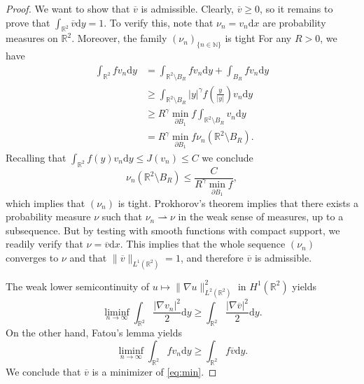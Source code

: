 \documentclass[10pt,a4paper]{article}
\newcommand{\NN}{\mathbb{N}}
\newcommand{\RR}{\mathbb{R}}
\numberwithin{equation}{section}
\begin{document}
\begin{proof}
	We want to show that $ \overline{v} $ is admissible. Clearly, $ \overline{v} \geq 0 $, so it remains to prove that $ \int_{\RR^{2}} \overline{v} \mathrm{d}y = 1  $. To verify this, note that $ \nu_n =  v_n \mathrm{d}x $ are probability measures on $ \RR^{2} $. Moreover, the family $ (\nu_n)_{\{n\in \NN\}} $ is tight For any $ R > 0 $, we have
	\begin{align*}
		\int_{\RR^{2}} f v_n \mathrm{d}y &= \int_{\RR^{2}\setminus B_R} f v_n \mathrm{d}y + \int_{B_R} f v_n \mathrm{d}y \\
						    &\geq \int_{\RR^{2}\setminus B_R} |y|^{\gamma} f \left( \frac{y}{|y|} \right)  v_n \mathrm{d}y \\
						    &\geq R^{\gamma} \min_{\partial B_1} f \int_{\RR^{2}\setminus B_R} v_n \mathrm{d}y \\
						    &= R^{\gamma} \min_{\partial B_1}f \nu_n(\RR^{2}\setminus	B_R).
	\end{align*}
	Recalling that $ \int_{\RR^{2}} f(y) v_n \mathrm{d}y \leq J(v_n) \leq C $ we conclude
	\[\nu_n (\RR^{2}\setminus B_R) \leq \frac{C}{R^{\gamma} \min_{\partial B_1}f},\]
	which implies that $ (\nu_n) $ is tight. Prokhorov's theorem \cite[Theorem 8.6.1]{Bog07} implies that there exists a probability measure $ \nu $ such that $ \nu_n \rightharpoonup \nu $ in the weak sense of measures, up to a subsequence. But by testing with smooth functions with compact support, we readily verify that $ \nu = \overline{v} \mathrm{d}x$. This implies that the whole sequence $ (\nu_n) $ converges to $ \nu $ and that $ \|\overline{v} \|_{L^{1}(\RR^{2})} = 1$, and therefore $ \overline{v}  $ is admissible.

	The weak lower semicontinuity of $ u \mapsto \| \nabla u \|^{2}_{L^{2}(\RR^{2})} $ in $ H^{1}(\RR^{2}) $ yields
	\[\liminf_{n\rightarrow \infty}\int_{\RR^{2}} \frac{|\nabla v_n |^{2}}{2} \mathrm{d}y \geq \int_{\RR^{2}} \frac{|\nabla \overline{v}|^{2}}{2} \mathrm{d} y.  \]
	On the other hand, Fatou's lemma yields
	\[\liminf_{n\rightarrow \infty}\int_{\RR^{2}} f v_n \mathrm{d}y \geq \int_{\RR^{2}} f \overline{v} \mathrm{d}y.  \]
We conclude that $ \overline{v} $ is a minimizer of \eqref{eq:min}.


\end{proof}
\end{document}
